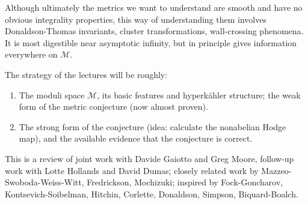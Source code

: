 \documentclass[12pt,letterpaper,reqno]{article}
\numberwithin{equation}{section}
\newcommand{\cM}{\ensuremath{\mathcal M}}
\newcommand{\hk}{hyperk\"ahler\xspace}
\newcommand{\e}{{\mathrm e}}
\newcommand{\sing}{\mathrm{sing}}
\newcommand{\reg}{\mathrm{reg}}
\renewcommand{\sf}{\mathrm{sf}}
\newcommand{\ti}[1]{\textit{#1}}
\DeclareMathOperator{\DT}{DT}
\begin{document}
Although ultimately the metrics we want to understand
are smooth and have no obvious integrality properties,
this way of understanding them involves Donaldson-Thomas
invariants, cluster transformations, 
wall-crossing phenomena.
It is most digestible near asymptotic infinity, but in principle
gives information everywhere on $\cM$.



The strategy of the lectures will be roughly:
\begin{enumerate}
  \item The moduli space $\cM$, its basic features and \hk structure; the weak form of the metric conjecture (now almost proven).
  \item The strong form of the conjecture (idea: calculate the nonabelian Hodge map), 
  and the available evidence that the conjecture is correct.
\end{enumerate}

This is a review of joint work with Davide Gaiotto and Greg Moore,
follow-up work with Lotte Hollands and David Dumas; closely related 
work by Mazzeo-Swoboda-Weiss-Witt, Fredrickson, Mochizuki; 
inspired by Fock-Goncharov, Kontsevich-Soibelman, Hitchin,
Corlette, Donaldson, Simpson, Biquard-Boalch.
\end{document}
